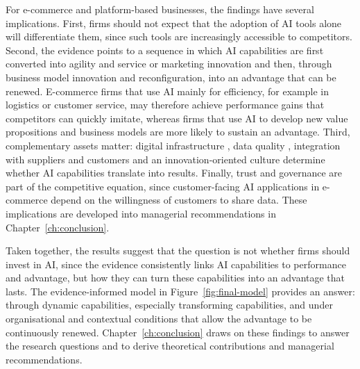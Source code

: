 For e-commerce and platform-based businesses, the findings have several implications. First, firms should not expect that the adoption of AI tools alone will differentiate them, since such tools are increasingly accessible to competitors. Second, the evidence points to a sequence in which AI capabilities are first converted into agility and service or marketing innovation and then, through business model innovation and reconfiguration, into an advantage that can be renewed. E-commerce firms that use AI mainly for efficiency, for example in logistics or customer service, may therefore achieve performance gains that competitors can quickly imitate, whereas firms that use AI to develop new value propositions and business models are more likely to sustain an advantage. Third, complementary assets matter: digital infrastructure \parencite[1]{slrR111}, data quality \parencite[1]{slrR050}, integration with suppliers and customers \parencites[1]{slrR083}[290]{slrR241} and an innovation-oriented culture \parencite[1]{chen2022} determine whether AI capabilities translate into results. Finally, trust and governance are part of the competitive equation, since customer-facing AI applications in e-commerce depend on the willingness of customers to share data. These implications are developed into managerial recommendations in Chapter~\ref{ch:conclusion}.

Taken together, the results suggest that the question is not whether firms should invest in AI, since the evidence consistently links AI capabilities to performance and advantage, but how they can turn these capabilities into an advantage that lasts. The evidence-informed model in Figure~\ref{fig:final-model} provides an answer: through dynamic capabilities, especially transforming capabilities, and under organisational and contextual conditions that allow the advantage to be continuously renewed. Chapter~\ref{ch:conclusion} draws on these findings to answer the research questions and to derive theoretical contributions and managerial recommendations.
